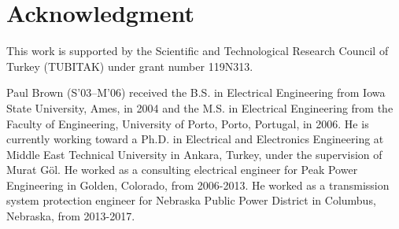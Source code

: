 \documentclass[conference,a4paper]{IEEEtran}[2015/08/26]
\begin{document}





\ifCLASSOPTIONcompsoc
\else
  \section*{Acknowledgment}
  This work is supported by the Scientific and Technological
  Research Council of Turkey (TUBITAK) under grant number
  119N313.
\fi





%


\begin{IEEEbiography}{Paul Brown}
	(S’03–M’06)
	received the B.S. in Electrical Engineering from Iowa State University, Ames, in 2004
	and the M.S. in Electrical Engineering from the Faculty of Engineering, University of Porto, Porto, Portugal, in 2006.
	He is currently working toward a Ph.D. in Electrical and Electronics Engineering at Middle East Technical University in Ankara, Turkey, under the supervision of Murat Göl.
	He worked as a consulting electrical engineer for Peak Power Engineering in Golden, Colorado, from 2006-2013.
	He worked as a transmission system protection engineer for Nebraska Public Power District in Columbus, Nebraska, from 2013-2017.
\end{IEEEbiography}
\end{document}
